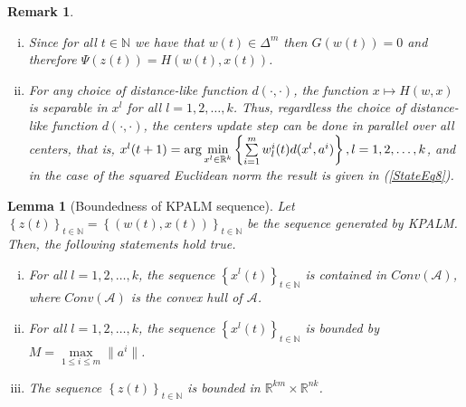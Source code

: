 \documentclass[11pt]{article}
\numberwithin{equation}{section}
\newtheorem{lemma}{Lemma}[proposition]
\newtheorem{remark}{Remark}
\begin{document}
\begin{remark} 
	\begin{enumerate}[(i)] \label{StateEq15}
		\item Since for all $t \in \mathbb{N}$ we have that $w(t) \in \Delta^m$ then $G(w(t))=0$ and therefore $\Psi(z(t)) = H(w(t),x(t))$. \label{StateEq16}
		\item For any choice of distance-like function $d(\cdot, \cdot)$, the function $x \mapsto H(w,x)$ is separable in $x^l$ for all $l = 1, 2, \ldots, k$. Thus, regardless the choice of distance-like function $d(\cdot, \cdot)$, the centers update step can be done in parallel over all centers, that is, $x^l(t+1) = \arg\min\limits_{x^l \in \mathbb{R}^k} \left\lbrace \sum\limits_{i=1}^{m} w^i_l(t) d(x^l , a^i) \right\rbrace, \\ l = 1, 2, \ldots, k$, and in the case of the squared Euclidean norm the result is given in (\ref{StateEq8}).
	\end{enumerate}
\end{remark}

\begin{lemma}[Boundedness of KPALM sequence]
Let $\left\lbrace z(t) \right\rbrace_{t \in \mathbb{N}} = \left\lbrace (w(t) , x(t)) \right\rbrace_{t \in \mathbb{N}}$ be the sequence generated by KPALM. Then, the following statements hold true.
\begin{enumerate}[(i)]
	\item For all $l=1, 2, \ldots ,k$, the sequence $\left\lbrace x^l(t) \right\rbrace_{t \in \mathbb{N}}$ is contained in $Conv(\mathcal{A})$, where $Conv(\mathcal{A})$ is the convex hull of $\mathcal{A}$.
	\item For all $l=1, 2, \ldots ,k$, the sequence $\left\lbrace x^l(t) \right\rbrace_{t \in \mathbb{N}}$ is bounded by $M = \max\limits_{1 \leq i \leq m} \| a^i \|$.
	\item The sequence $\left\lbrace z(t) \right\rbrace_{t \in \mathbb{N}}$ is bounded in $\mathbb{R}^{km} \times \mathbb{R}^{nk}$.
\end{enumerate}
\end{lemma}
\end{document}
